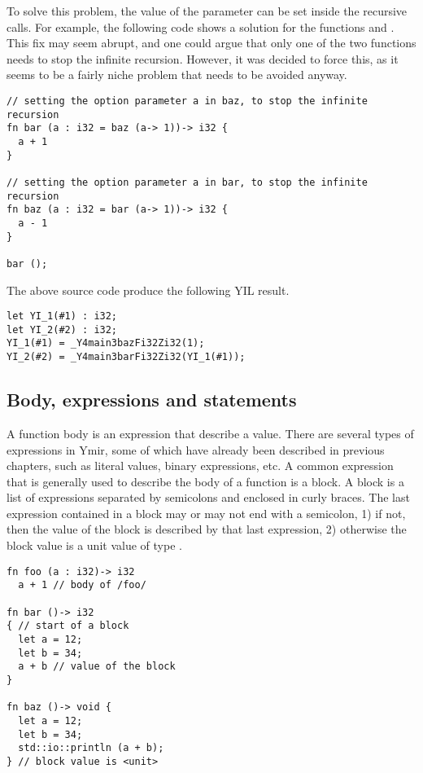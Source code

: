 To solve this problem, the value of the parameter  can be set inside
the recursive calls. For example, the following code shows a solution for the
functions  and . This fix may seem abrupt, and one could
argue that only one of the two functions needs to stop the infinite recursion.
However, it was decided to force this, as it seems to be a fairly niche problem
that needs to be avoided anyway.

\begin{lstlisting}[style=coloredverbatim]
// setting the option parameter a in baz, to stop the infinite recursion
fn bar (a : i32 = baz (a-> 1))-> i32 {
  a + 1
}

// setting the option parameter a in bar, to stop the infinite recursion
fn baz (a : i32 = bar (a-> 1))-> i32 {
  a - 1
}

bar ();
\end{lstlisting}

The above source code produce the following YIL result.

\begin{lstlisting}[style=intermediateVerb]
let YI_1(#1) : i32;
let YI_2(#2) : i32;
YI_1(#1) = _Y4main3bazFi32Zi32(1);
YI_2(#2) = _Y4main3barFi32Zi32(YI_1(#1));
\end{lstlisting}

\subsection {Body, expressions and statements}
\label{sec:function_body}

A function body is an expression that describe a value. There are several types
of expressions in Ymir, some of which have already been described in previous
chapters, such as literal values, binary expressions, etc. A common expression
that is generally used to describe the body of a function is a block. A block is
a list of expressions separated by semicolons and enclosed in curly braces. The
last expression contained in a block may or may not end with a semicolon, 1) if
not, then the value of the block is described by that last expression, 2)
otherwise the block value is a unit value of type .

\begin{lstlisting}[style=coloredverbatim]
fn foo (a : i32)-> i32
  a + 1 // body of /foo/

fn bar ()-> i32
{ // start of a block
  let a = 12;
  let b = 34;
  a + b // value of the block
}

fn baz ()-> void {
  let a = 12;
  let b = 34;
  std::io::println (a + b);
} // block value is <unit>

\end{lstlisting}

